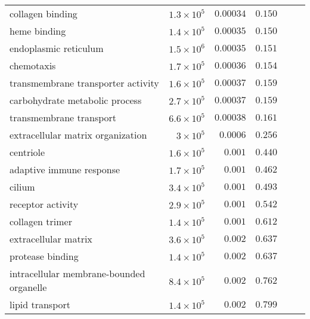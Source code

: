\begin{longtable*}{|l|r|r|r|r|r|}
    collagen binding                         & $1.3\times 10^{5}$ & $0.00034$            & $ 0.150~~$                      \\
    heme binding                             & $1.4\times 10^{5}$ & $0.00035$            & $ 0.150~~$                      \\
    endoplasmic reticulum                    & $1.5\times 10^{6}$ & $0.00035$            & $ 0.151~~$                      \\
    chemotaxis                               & $1.7\times 10^{5}$ & $0.00036$            & $ 0.154~~$                      \\
    transmembrane transporter activity       & $1.6\times 10^{5}$ & $0.00037$            & $ 0.159~~$                      \\
    carbohydrate metabolic process           & $2.7\times 10^{5}$ & $0.00037$            & $ 0.159~~$                      \\
    transmembrane transport                  & $6.6\times 10^{5}$ & $0.00038$            & $ 0.161~~$                      \\
    extracellular matrix organization        & $ 3\times 10^{5}$  & $0.0006$             & $ 0.256~~$                      \\
    centriole                                & $1.6\times 10^{5}$ & $ 0.001$             & $ 0.440~~$                      \\
    adaptive immune response                 & $1.7\times 10^{5}$ & $ 0.001$             & $ 0.462~~$                      \\
    cilium                                   & $3.4\times 10^{5}$ & $ 0.001$             & $ 0.493~~$                      \\
    receptor activity                        & $2.9\times 10^{5}$ & $ 0.001$             & $ 0.542~~$                      \\
    collagen trimer                          & $1.4\times 10^{5}$ & $ 0.001$             & $ 0.612~~$                      \\
    extracellular matrix                     & $3.6\times 10^{5}$ & $ 0.002$             & $ 0.637~~$                      \\
    protease binding                         & $1.4\times 10^{5}$ & $ 0.002$             & $ 0.637~~$                      \\
    intracellular membrane-bounded organelle & $8.4\times 10^{5}$ & $ 0.002$             & $ 0.762~~$                      \\
    lipid transport                          & $1.4\times 10^{5}$ & $ 0.002$             & $ 0.799~~$                      \\
\end{longtable*}